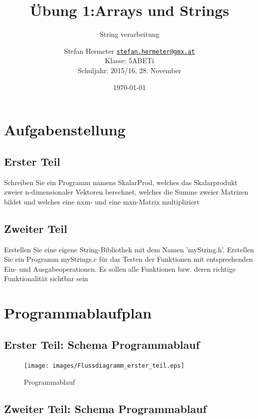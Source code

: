 \documentclass{scrartcl}
\newcommand{\mytitle}{Übung 1}
\begin{document}
\title{\mytitle:Arrays und Strings}
\subtitle{String verarbeitung}
\date{\today}
\author{Stefan Hermeter \texttt{\href{mailto:stefan.hermeter@gmx.at}{stefan.hermeter@gmx.at}}\\
  Klasse: 5ABETi\\
  Schuljahr: 2015/16, 28. November}
\maketitle
{}
\newpage
\tableofcontents
\listoffigures
\newpage
{}
\section{Aufgabenstellung}
\subsection{Erster Teil}
Schreiben Sie ein Programm namens SkalarProd, welches das Skalarprodukt zweier n-dimensionaler Vektoren berechnet, welches die Summe zweier Matrizen bildet und welches eine nxm- und eine mxn-Matrix multipliziert\\

\subsection{Zweiter Teil}
Erstellen Sie eine eigene String-Bibliothek mit dem Namen 'myString.h'. Erstellen Sie ein Programm myStrings.c für das Testen der Funktionen mit entsprechenden Ein- und Ausgabeoperationen. Es sollen alle Funktionen bzw. deren richtige Funktionalität sichtbar sein

\section{Programmablaufplan}
\subsection{Erster Teil: Schema Programmablauf}
\begin{figure}[H]
  \centering
  \texttt{[image: images/Flussdiagramm\_erster\_teil.eps]}
  \caption{Programmablauf}
  \label{fig:digraph}
\end{figure}
\subsection{Zweiter Teil: Schema Programmablauf}
\end{document}
